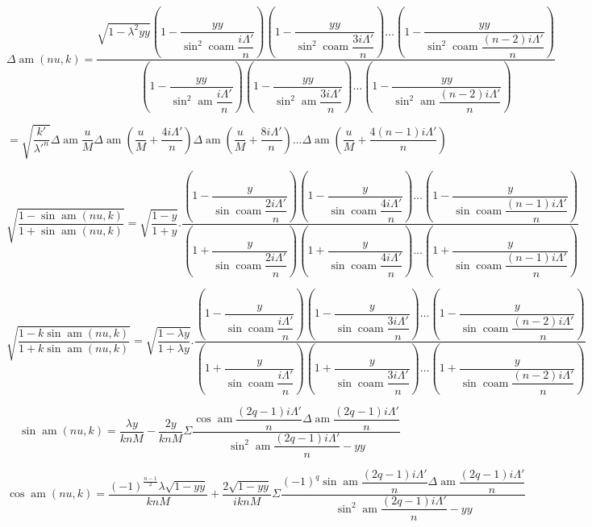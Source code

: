 \documentclass{article}
\begin{document}
\[
\Delta\operatorname{am}(nu,k)=\frac{\sqrt{1-\lambda^{2}yy}\left(1-\dfrac{yy}{\sin^{2}\operatorname{coam}\dfrac{i\Lambda'}{n}}\right)\left(1-\dfrac{yy}{\sin^{2}\operatorname{coam}\dfrac{3i\Lambda'}{n}}\right)\ldots\left(1-\dfrac{yy}{\sin^{2}\operatorname{coam}\dfrac{(n-2)i\Lambda'}{n}}\right)}{\left(1-\dfrac{yy}{\sin^{2}\operatorname{am}\dfrac{i\Lambda'}{n}}\right)\left(1-\dfrac{yy}{\sin^{2}\operatorname{am}\dfrac{3i\Lambda'}{n}}\right)\ldots\left(1-\dfrac{yy}{\sin^{2}\operatorname{am}\dfrac{(n-2)i\Lambda'}{n}}\right)}
\]

\[
=\sqrt{\frac{k'}{\lambda'^{n}}}\Delta\operatorname{am}\frac{u}{M}\Delta\operatorname{am}\left(\frac{u}{M}+\frac{4i\Lambda'}{n}\right)\Delta\operatorname{am}\left(\frac{u}{M}+\frac{8i\Lambda'}{n}\right)\ldots\Delta\operatorname{am}\left(\frac{u}{M}+\frac{4(n-1)i\Lambda'}{n}\right)
\]

\[
\sqrt{\frac{1-\sin\operatorname{am}(nu,k)}{1+\sin\operatorname{am}(nu,k)}}=\sqrt{\frac{1-y}{1+y}}.\frac{\left(1-\dfrac{y}{\sin\operatorname{coam}\dfrac{2i\Lambda'}{n}}\right)\left(1-\dfrac{y}{\sin\operatorname{coam}\dfrac{4i\Lambda'}{n}}\right)\ldots\left(1-\dfrac{y}{\sin\operatorname{coam}\dfrac{(n-1)i\Lambda'}{n}}\right)}{\left(1+\dfrac{y}{\sin\operatorname{coam}\dfrac{2i\Lambda'}{n}}\right)\left(1+\dfrac{y}{\sin\operatorname{coam}\dfrac{4i\Lambda'}{n}}\right)\ldots\left(1+\dfrac{y}{\sin\operatorname{coam}\dfrac{(n-1)i\Lambda'}{n}}\right)}
\]

\[
\sqrt{\frac{1-k\sin\operatorname{am}(nu,k)}{1+k\sin\operatorname{am}(nu,k)}}=\sqrt{\frac{1-\lambda y}{1+\lambda y}}.\frac{\left(1-\dfrac{y}{\sin\operatorname{coam}\dfrac{i\Lambda'}{n}}\right)\left(1-\dfrac{y}{\sin\operatorname{coam}\dfrac{3i\Lambda'}{n}}\right)\ldots\left(1-\dfrac{y}{\sin\operatorname{coam}\dfrac{(n-2)i\Lambda'}{n}}\right)}{\left(1+\dfrac{y}{\sin\operatorname{coam}\dfrac{i\Lambda'}{n}}\right)\left(1+\dfrac{y}{\sin\operatorname{coam}\dfrac{3i\Lambda'}{n}}\right)\ldots\left(1+\dfrac{y}{\sin\operatorname{coam}\dfrac{(n-2)i\Lambda'}{n}}\right)}
\]

\[
\sin\operatorname{am}(nu,k)=\frac{\lambda y}{knM}-\frac{2y}{knM}\Sigma\frac{\cos\operatorname{am}\dfrac{(2q-1)i\Lambda'}{n}\Delta\operatorname{am}\dfrac{(2q-1)i\Lambda'}{n}}{\sin^{2}\operatorname{am}\dfrac{(2q-1)i\Lambda'}{n}-yy}
\]

\[
\cos\operatorname{am}(nu,k)=\frac{(-1)^{\frac{n-1}{2}}\lambda\sqrt{1-yy}}{knM}+\frac{2\sqrt{1-yy}}{iknM}\Sigma\frac{(-1)^{q}\sin\operatorname{am}\dfrac{(2q-1)i\Lambda'}{n}\Delta\operatorname{am}\dfrac{(2q-1)i\Lambda'}{n}}{\sin^{2}\operatorname{am}\dfrac{(2q-1)i\Lambda'}{n}-yy}
\]
\end{document}
